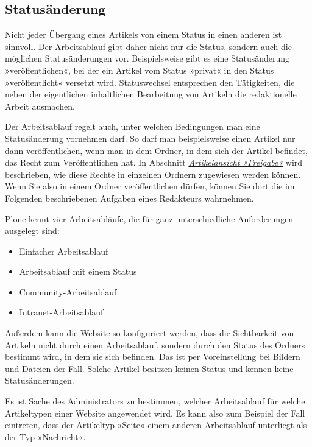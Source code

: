 \documentclass[a4paper,12pt,ngerman]{manual}
\begin{document}
\subsection{Statusänderung}

Nicht jeder Übergang eines Artikels von einem Status in einen anderen
ist sinnvoll. Der Arbeitsablauf gibt daher nicht nur die Status,
sondern auch die möglichen Statusänderungen vor. Beispielsweise gibt
es eine Statusänderung »veröffentlichen«, bei der ein Artikel vom
Status »privat« in den Status »veröffentlicht« versetzt
wird. Statuswechsel entsprechen den Tätigkeiten, die neben der
eigentlichen inhaltlichen Bearbeitung von Artikeln die redaktionelle
Arbeit ausmachen.

Der Arbeitsablauf regelt auch, unter welchen Bedingungen man eine
Statusänderung vornehmen darf. So darf man beispielsweise einen Artikel nur
dann veröffentlichen, wenn man in dem Ordner, in dem sich der Artikel
befindet, das Recht zum Veröffentlichen hat. In
Abschnitt \hyperlink{sec-zugriffsrechte-ansicht}{\emph{Artikelansicht »Freigabe«}} wird beschrieben, wie diese
Rechte in einzelnen Ordnern zugewiesen werden können. Wenn Sie also in einem
Ordner veröffentlichen dürfen, können Sie dort die im Folgenden beschriebenen
Aufgaben eines Redakteurs wahrnehmen.

Plone kennt vier Arbeitsabläufe, die für ganz unterschiedliche
Anforderungen ausgelegt sind:
\begin{itemize}
\item {} 
Einfacher Arbeitsablauf

\item {} 
Arbeitsablauf mit einem Status

\item {} 
Community-Arbeitsablauf

\item {} 
Intranet-Arbeitsablauf

\end{itemize}

Außerdem kann die Website so konfiguriert werden, dass die
Sichtbarkeit von Artikeln nicht durch einen Arbeitsablauf, sondern
durch den Status des Ordners bestimmt wird, in dem sie sich
befinden. Das ist per Voreinstellung bei Bildern und Dateien der
Fall. Solche Artikel besitzen keinen Status und kennen keine
Statusänderungen.

Es ist Sache des Administrators zu bestimmen, welcher Arbeitsablauf
für welche Artikeltypen einer Website angewendet wird. Es kann also
zum Beispiel der Fall eintreten, dass der Artikeltyp »Seite« einem
anderen Arbeitsablauf unterliegt als der Typ »Nachricht«.
\hypertarget{sec-einf-publ}{}
\end{document}
